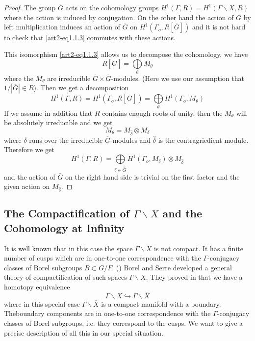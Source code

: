 \begin{proof}
The group $\overline{G}$ acts on the cohomology groups $H^{1}(\Gamma,R)=H^{1}(\Gamma\backslash X,R)$ where the action is induced by conjugation. On the other hand the action of $\overline{G}$ by left multiplication induces an action of $\overline{G}$ on $H^{1}(\Gamma_{o},R[\overline{G}])$ and it is not hard to check that \eqref{art2-eq1.1.3} commutes with these actions.

This isomorphism \eqref{art2-eq1.1.3} allows us to decompose the cohomology, we have
$$
R[\overline{G}]=\bigoplus\limits_{\theta}M_{\theta}
$$
where the $M_{\theta}$ are irreducible $\overline{G}\times \overline{G}$-modules. (Here we use our assumption that $1/|\overline{G}|\in R$). Then we get a decomposition
$$
H^{1}(\Gamma,R)=H^{1}(\Gamma_{o},R[\overline{G}])=\bigoplus\limits_{\theta}H^{1}(\Gamma_{o},M_{\theta})
$$
If we assume in addition that $R$ contains enough roots of unity, then the $M_{\theta}$ will be absolutely irreducible and we get
$$
M_{\theta}=M_{\widehat{\delta}}\otimes M_{\delta}
$$
where $\delta$ runs over the irreducible $\overline{G}$-modules and $\widehat{\delta}$ is the contragriedient module. Therefore we get
$$
H^{1}(\Gamma,R)=\bigoplus\limits_{\delta\in \widehat{\overline{G}}}H^{1}(\Gamma_{o},M_{\delta})\otimes M_{\widehat{\delta}}
$$
and the action of $\overline{G}$ on the right hand side is trivial on the first factor and the given action on $M_{\widehat{\delta}}$.
\end{proof}

\subsection{The Compactification of $\Gamma\backslash X$ and the Cohomology at Infinity}\label{art2-sec1.2}
It is well known that in this case the space $\Gamma\backslash X$ is not compact. It has a finite number of cusps which are in one-to-one correspondence with the $\Gamma$-conjugacy classes of Borel subgroups $B\subset G/F$. (\cite{art2-key1}) Borel and Serre developed a general theory of compactification of such spaces $\Gamma\backslash X$. They proved in \cite{art2-key3} that we have a homotopy equivalence
$$
\Gamma\backslash X\hookrightarrow \Gamma\backslash \overline{X}
$$
where in this special case $\Gamma\backslash \overline{X}$ is a compact manifold with a boundary. The\pageoriginale boundary components are in one-to-one correspondence with the $\Gamma$-conjugacy classes of Borel subgroups, i.e. they correspond to the cusps. We want to give a precise description of all this in our special situation.

